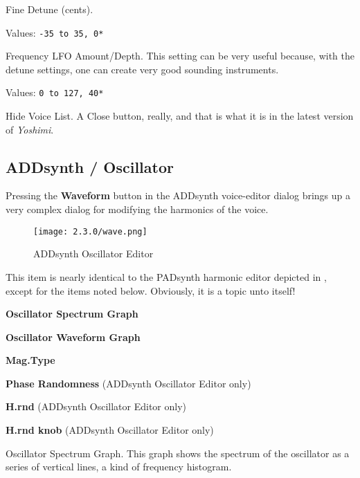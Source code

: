    Fine Detune (cents).

   Values: \texttt{-35 to 35, 0*}

   Frequency LFO Amount/Depth.
   This setting can be very useful because, with the detune settings, one can
   create very good sounding instruments.

   Values: \texttt{0 to 127, 40*}

   Hide Voice List.  A Close button, really, and that is what it is in the
   latest version of \textsl{Yoshimi}.

\subsection{ADDsynth / Oscillator}
\label{subsec:addsynth_oscillator}

   Pressing the \textbf{Waveform} button in the ADDsynth
   voice-editor dialog brings up a very complex dialog for modifying the
   harmonics of the voice.

\begin{figure}[H]
   \centering
   \texttt{[image: 2.3.0/wave.png]}
   \caption{ADDsynth Oscillator Editor}
   \label{fig:addsynth_oscillator_editor}
\end{figure}

   This item is nearly identical to the PADsynth harmonic editor depicted in
   ,
   except for the items noted below.
   Obviously, it is a topic unto itself!

   \begin{enumber}
      \item \textbf{Oscillator Spectrum Graph}
      \item \textbf{Oscillator Waveform Graph}
      \item \textbf{Mag.Type}
      \item \textbf{Phase Randomness} (ADDsynth Oscillator Editor only)
      \item \textbf{H.rnd} (ADDsynth Oscillator Editor only)
      \item \textbf{H.rnd knob} (ADDsynth Oscillator Editor only)
   \end{enumber}

   \setcounter{ItemCounter}{0}      %

   Oscillator Spectrum Graph.
   This graph shows the spectrum of the oscillator as a series of vertical
   lines, a kind of frequency histogram.


